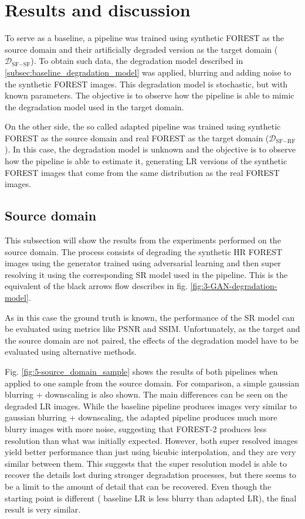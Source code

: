 \section{Results and discussion}\label{sec:results}

To serve as a baseline, a pipeline was trained using synthetic FOREST as the source domain and their artificially degraded version as the target domain ($\mathcal{D}_{\text{SF}-\text{SF}}$). 
To obtain such data, the degradation model described in \ref{subsec:baseline_degradation_model} was applied, blurring and adding noise to the synthetic FOREST images.
This degradation model is stochastic, but with known parameters. The objective is to observe how the pipeline is able to mimic the degradation model used in the target domain.

On the other side, the so called adapted pipeline was trained using synthetic FOREST as the source domain and real FOREST as the target domain ($\mathcal{D}_{\text{SF}-\text{RF}}$). 
In this case, the degradation model is unknown and the objective is to observe how the pipeline is able to estimate it, generating LR versions of the synthetic FOREST images that come from the same distribution as the real FOREST images.

    \subsection{Source domain}

        This subsection will show the results from the experiments performed on the source domain.
        The process consists of degrading the synthetic HR FOREST images using the generator trained using adversarial learning and then super resolving it using the corresponding SR model used in the pipeline.
        This is the equivalent of the black arrows flow describes in fig. \ref{fig:3-GAN-degradation-model}. 

        As in this case the ground truth is known, the performance of the SR model can be evaluated using metrics like PSNR and SSIM. 
        Unfortunately, as the target and the source domain are not paired, the effects of the degradation model have to be evaluated using alternative methods.

        Fig. \ref{fig:5-source_domain_sample} shows the results of both pipelines when applied to one sample from the source domain. 
        For comparison, a simple gaussian blurring + downscaling is also shown. 
        The main differences can be seen on the degraded LR images. While the baseline pipeline produces images very similar to gaussian blurring + downscaling, 
        the adapted pipeline produces much more blurry images with more noise, suggesting that FOREST-2 produces less resolution than what was initially expected. 
        However, both super resolved images yield better performance than just using bicubic interpolation, and they are very similar between them.
        This suggests that the super resolution model is able to recover the details lost during stronger degradation processes, but there seems to be a limit to the amount of detail that can be recovered. 
        Even though the starting point is different ( baseline LR is less blurry than adapted LR), the final result is very similar.

